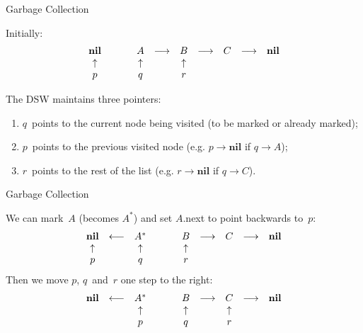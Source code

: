 \documentclass[compress,dvipdfmx]{beamer}
\begin{document}
%
\begin{frame}{Garbage Collection}

  Initially:
  \[
  \begin{array}{ccccccccc}
    \textbf{nil} & \hphantom{\longleftarrow} & A & \longrightarrow & B &
    \longrightarrow & C & \longrightarrow & \textbf{nil} \\
    \uparrow   && \uparrow && \uparrow \\
    p          && q        && r
  \end{array}
  \]

  \medskip

  The DSW maintains three pointers:
  \begin{enumerate}

    \item \(q\)~points to the current node being visited (to be
      marked or already marked);

    \item \(p\)~points to the previous visited node (e.g. \(p
      \rightarrow \textbf{nil}\) if \(q \rightarrow A\));

    \item \(r\)~points to the rest of the list (e.g. \(r \rightarrow
      \textbf{nil}\) if \(q \rightarrow C\)).

  \end{enumerate}

\end{frame}

%
\begin{frame}{Garbage Collection}

  We can mark~\(A\) (becomes \(A^*\)) and set \(A\).next to point
  backwards to~\(p\):
  \[
  \begin{array}{ccccccccc}
    \textbf{nil} & \longleftarrow & A^* & \hphantom{\longrightarrow} & B
    & \longrightarrow & C & \longrightarrow & \textbf{nil} \\
    \uparrow   && \uparrow && \uparrow          \\
    p          && q        && r
  \end{array}
  \]
  Then we move \(p\), \(q\)~and~\(r\) one step to the right:
  \[
  \begin{array}{ccccccccc}
    \textbf{nil} & \longleftarrow & A^* & \hphantom{\longrightarrow} & B
    & \longrightarrow & C & \longrightarrow & \textbf{nil} \\
    && \uparrow && \uparrow && \uparrow \\
    && p        && q        && r
  \end{array}
  \]

\end{frame}
\end{document}
